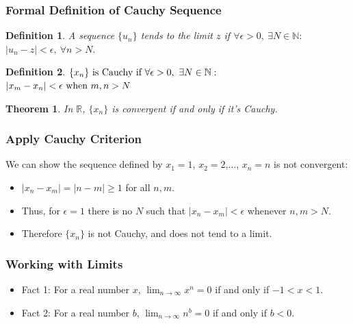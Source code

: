 \documentclass[handout]{beamer}
\newtheorem{thm}{Theorem}
\newtheorem{defn}{Definition}
\numberwithin{equation}{section}
\begin{document}
\begin{frame}
\frametitle{Formal Definition of Cauchy Sequence}

\begin{defn}
A sequence $\{ u_{n} \}$ tends to the limit $z$ if $\forall \epsilon>0,\ \exists N\in \mathbb{N}:$\\ $|u_n-z|<\epsilon,\ \forall n>N.$\pause
\end{defn}

\begin{defn}
$\{x_n\} \hbox{ is Cauchy if } \forall\epsilon>0,\ \exists N\in \mathbb{N}:$\\$|x_{m} - x_{n}|<\epsilon \hbox{ when }m, n>N$
\end{defn}

\begin{thm}
In $\mathbb{R}$, $\{x_{n} \}$ is convergent if and only if it's Cauchy.
\end{thm}

\end{frame}


\begin{frame}
\frametitle{Apply Cauchy Criterion}

We can show the sequence defined by $x_1=1$, $x_2=2$,$\ldots$, $x_n=n$ is not convergent: \pause
\begin{itemize}
\item $|x_n-x_m|=|n-m|\geq 1$ for all $n, m$.\pause
\item Thus, for $\epsilon=1$ there is no $N$ such that $|x_n-x_m|<\epsilon$ whenever $n, m>N$.  \pause
\item  Therefore $\{x_n\}$ is not Cauchy, and does not tend to a limit.
\end{itemize}
\end{frame}



\begin{frame}
\frametitle{Working with Limits}

\begin{itemize}
\item Fact 1: For a real number $x$, $\lim_{n\rightarrow\infty}x^n=0$ if and only if $-1<x<1$. \pause
\item Fact 2: For a real number $b$, $\lim_{n\rightarrow\infty}n^b=0$ if and only if $b<0$.
\end{itemize}

\end{frame}
\end{document}
